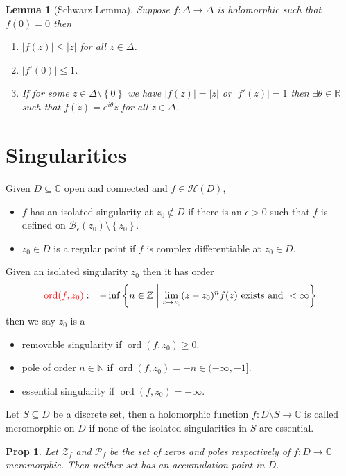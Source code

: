 \documentclass[11pt]{article}
\newcommand{\defeq}{:=}
\newcommand{\abs}[1]{\left|#1\right|}
\DeclareMathOperator{\ord}{\text{ord}}
\newcommand{\relmiddle}[1]{\mathrel{}\middle#1\mathrel{}}
\newcommand{\rmv}{\relmiddle|}
\newcommand{\R}{\mathbb{R}}
\newcommand{\C}{\mathbb{C}}
\newcommand{\Z}{\mathbb{Z}}
\newcommand{\N}{\mathbb{N}}
\newenvironment{defin}
	{\begin{mdframed}[backgroundcolor=white, roundcorner=5pt, linewidth=1pt]}
	{\end{mdframed}}
\newcommand{\mdf}[1]{{\color{red} #1}}
\newtheorem{prop}[theorem]{Prop}
\newtheorem{lemma}[theorem]{Lemma}
\begin{document}
\begin{lemma}[Schwarz Lemma]
Suppose $f:\Delta\to\Delta$ is holomorphic such that $f(0)=0$ then
\begin{enumerate}[label=(\roman*)]
	\item $\abs{f(z)}\leq\abs{z}$ for all $z\in\Delta$.
	\item $\abs{f'(0)}\leq 1$.
	\item If for some $z\in\Delta\setminus\left\{0\right\}$ we have $\abs{f(z)}=\abs{z}$ or $\abs{f'(z)}=1$ then $\exists\theta\in\R$ such that $f(\widetilde{z})=e^{i\theta}\widetilde{z}$ for all $\widetilde{z}\in\Delta$.
\end{enumerate}
\end{lemma}

\section{Singularities}

\begin{defin}
	Given $D\subseteq \C$ open and connected and $f\in\mathcal{H}(D)$,
	\begin{itemize}
		\item $f$ has an \mdf{isolated singularity} at $z_0\not\in D$ if there is an $\epsilon >0$ such that $f$ is defined on $\mathcal{B}_\epsilon(z_0)\setminus\left\{z_0\right\}$.
		\item $z_0\in D$ is a \mdf{regular point} if $f$ is complex differentiable at $z_0\in D$.
	\end{itemize}
	Given an isolated singularity $z_0$ then it has \mdf{order}
	\[
		\mdf{\ord(f,z_0)}\defeq-\inf\left\{n\in\Z \rmv \lim_{z\to z_0} (z-z_0)^n f(z) \text{ exists and }<\infty\right\}
	\]
	then we say $z_0$ is a
	\begin{itemize}
		\item \mdf{removable singularity} if $\ord(f,z_0)\geq 0$.
		\item \mdf{pole of order $n\in\N$} if $\ord(f, z_0)=-n\in(-\infty, -1]$.
		\item \mdf{essential singularity} if $\ord(f, z_0)=-\infty$.
	\end{itemize}
	Let $S\subseteq D$ be a discrete set, then a holomorphic function $f:D\setminus S\to\C$ is called \mdf{meromorphic on $D$} if none of the isolated singularities in $S$ are essential.
\end{defin}

\begin{prop}
Let $\mathcal{Z}_f$ and $\mathcal{P}_f$ be the set of zeros and poles respectively of $f:D\to\C$ meromorphic.
Then neither set has an accumulation point in $D$.
\end{prop}
\end{document}
